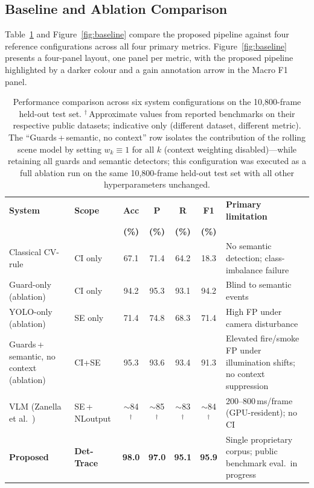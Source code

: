 \documentclass[sensors,article,submit,pdftex,moreauthors]{Definitions/mdpi}
\begin{document}
\subsection{Baseline and Ablation Comparison}
\label{sec:baseline}
 
Table~\ref{tab:baseline-compare} and Figure~\ref{fig:baseline} compare the
proposed pipeline against four reference configurations across all four
primary metrics. Figure~\ref{fig:baseline} presents a four-panel layout, one
panel per metric, with the proposed pipeline highlighted by a darker colour
and a gain annotation arrow in the Macro F1 panel.
 
\begin{table}[H]
\caption{Performance comparison across six system configurations on the 10{,}800-frame held-out test set.
$^\dagger$\,Approximate values from reported benchmarks on their respective public datasets; indicative only (different dataset, different metric).
The ``Guards\,+\,semantic, no context'' row isolates the contribution of the
rolling scene model by setting $w_k \equiv 1$ for all $k$ (context weighting disabled)---while retaining all guards and semantic detectors;
this configuration was executed as a full ablation run on the same 10{,}800-frame
held-out test set with all other hyperparameters unchanged.}
\label{tab:baseline-compare}
\centering\small\setlength{\tabcolsep}{3.5pt}
\begin{tabular}{p{3.4cm} p{1.8cm} cccc p{2.4cm}}
\toprule
\textbf{System} & \textbf{Scope} & \textbf{Acc} & \textbf{P} &
\textbf{R} & \textbf{F1} & \textbf{Primary limitation} \\
 & & \textbf{(\%)} & \textbf{(\%)} & \textbf{(\%)} & \textbf{(\%)} & \\
\midrule
Classical CV-rule & CI only & 67.1 & 71.4 & 64.2 & 18.3 &
  No semantic detection; class-imbalance failure \\
Guard-only (ablation) & CI only & 94.2 & 95.3 & 93.1 & 94.2 &
  Blind to semantic events \\
YOLO-only (ablation) & SE only & 71.4 & 74.8 & 68.3 & 71.4 &
  High FP under camera disturbance \\
Guards\,+\,semantic, no context (ablation) & CI+SE & 95.3 & 93.6 & 93.4 & 91.3 &
  Elevated fire/smoke FP under illumination shifts; no context suppression \\
VLM (Zanella et al.~\cite{zanella2024harnessing}) & SE\,+\,NL\-output &
  $\sim$84$^{\dagger}$ & $\sim$85$^{\dagger}$ & $\sim$83$^{\dagger}$ &
  $\sim$84$^{\dagger}$ & 200--800\,ms/frame (GPU-resident); no CI \\
\midrule
\textbf{Proposed} & \textbf{Det-Trace} & \textbf{98.0} & \textbf{97.0} &
\textbf{95.1} & \textbf{95.9} & Single proprietary corpus; public benchmark eval.\ in progress \\
\bottomrule
\end{tabular}
\end{table}
 
\end{document}
